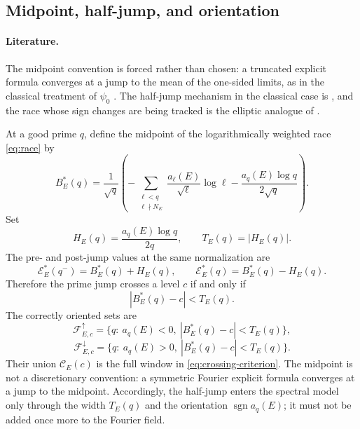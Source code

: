\documentclass[11pt,reqno]{amsart}
\theoremstyle{remark}
\begin{document}
\subsection{Midpoint, half-jump, and orientation}

\paragraph{Literature.}
The midpoint convention is forced rather than chosen: a truncated explicit formula converges at a jump to the mean of the one-sided limits, as in the classical treatment of $\psi_0$ \cite{IwaniecKowalski2004}.  The half-jump mechanism in the classical case is \cite{PlanatFalseCheb2026}, and the race whose sign changes are being tracked is the elliptic analogue of \cite{RubinsteinSarnak1994,Fiorilli2014}.

At a good prime $q$, define the midpoint of the logarithmically weighted race \eqref{eq:race} by
\begin{equation}
  B_E^{*}(q)=\frac{1}{\sqrt q}
  \left(
  -\sum_{\substack{\ell<q\\\ell\nmid N_E}}
   \frac{a_\ell(E)}{\sqrt\ell}\log\ell
  -\frac{a_q(E)\log q}{2\sqrt q}
  \right).
  \label{eq:midpoint}
\end{equation}
Set
\begin{equation}
  H_E(q)=\frac{a_q(E)\log q}{2q},
  \qquad T_E(q)=|H_E(q)|.
  \label{eq:half-jump}
\end{equation}
The pre- and post-jump values at the same normalization are
\begin{equation}
  \mathcal E_E^{*}(q^-)=B_E^{*}(q)+H_E(q),
  \qquad
  \mathcal E_E^{*}(q)=B_E^{*}(q)-H_E(q).
  \label{eq:endpoints}
\end{equation}
Therefore the prime jump crosses a level $c$ if and only if
\begin{equation}
  \boxed{|B_E^{*}(q)-c|<T_E(q).}
  \label{eq:crossing-criterion}
\end{equation}
The correctly oriented sets are
\begin{equation}
  \mathcal F^{\uparrow}_{E,c}
  =\{q:\ a_q(E)<0,\ |B_E^{*}(q)-c|<T_E(q)\},
  \label{eq:upward}
\end{equation}
\begin{equation}
  \mathcal F^{\downarrow}_{E,c}
  =\{q:\ a_q(E)>0,\ |B_E^{*}(q)-c|<T_E(q)\}.
  \label{eq:downward}
\end{equation}
Their union $\mathcal C_E(c)$ is the full window in \eqref{eq:crossing-criterion}.  The midpoint is not a discretionary convention: a symmetric Fourier explicit formula converges at a jump to the midpoint.  Accordingly, the half-jump enters the spectral model only through the width $T_E(q)$ and the orientation $\operatorname{sgn}a_q(E)$; it must not be added once more to the Fourier field.
\end{document}
